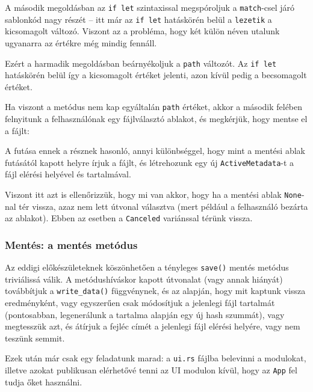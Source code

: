 A második megoldásban az \texttt{if let} szintaxissal megspóroljuk a \texttt{match}-csel
járó sablonkód nagy részét -- itt már az \texttt{if let} hatáskörén belül a \texttt{lezetik} a kicsomagolt változó.
Viszont az a probléma, hogy két külön néven utalunk ugyanarra az értékre még mindig fennáll.

Ezért a harmadik megoldásban beárnyékoljuk a \texttt{path} változót.
Az \texttt{if let} hatáskörén belül így a kicsomagolt értéket jelenti, 
azon kívül pedig a becsomagolt értéket.

Ha viszont a metódus nem kap egyáltalán \texttt{path} értéket, 
akkor a második felében felnyitunk a felhasználónak egy fájlválasztó ablakot,
és megkérjük, hogy mentse el a fájlt: 



A futása ennek a résznek hasonló, annyi különbséggel, hogy mint a mentési ablak futásától
kapott helyre írjuk a fájlt, és létrehozunk egy új \texttt{ActiveMetadata}-t
a fájl elérési helyével és tartalmával.

Viszont itt azt is ellenőrizzük, hogy mi van akkor, hogy ha a mentési ablak \texttt{None}-nal
tér vissza, azaz nem lett útvonal választva (mert például a felhasználó bezárta az ablakot).
Ebben az esetben a \texttt{Canceled} variánssal térünk vissza.

\subsubsection{Mentés: a mentés metódus}

Az eddigi előkészületeknek köszönhetően a tényleges \texttt{save()} mentés metódus triviálissá válik.
A metódushíváskor kapott útvonalat (vagy annak hiányát) továbbítjuk a \texttt{write\_data()} függvénynek,
és az alapján, hogy mit kaptunk vissza eredményként, vagy egyszerűen csak módosítjuk a jelenlegi
fájl tartalmát (pontosabban, legenerálunk a tartalma alapján egy új hash szummát),
vagy megtesszük azt, és átírjuk a fejléc címét a jelenlegi fájl elérési helyére,
vagy nem teszünk semmit.

Ezek után már csak egy feladatunk marad: a \texttt{ui.rs} fájlba belevinni a modulokat,
illetve azokat publikusan elérhetővé tenni az UI modulon kívül, hogy az \texttt{App}
fel tudja őket használni.